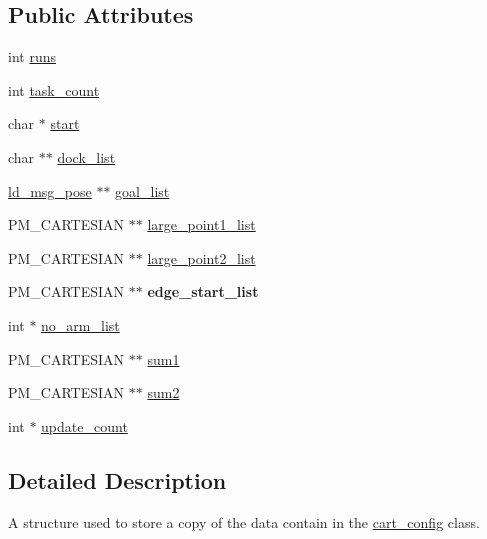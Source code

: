 \subsection*{Public Attributes}
\begin{DoxyCompactItemize}
\item 
int \mbox{\hyperlink{structconfig__data_adc9d0db49d5276dd09e63901adf2d3df}{runs}}
\item 
int \mbox{\hyperlink{structconfig__data_a59732367f47b44028e541b861b07e319}{task\+\_\+count}}
\item 
char $\ast$ \mbox{\hyperlink{structconfig__data_a9553e6685a392714b4d08b4081145565}{start}}
\item 
char $\ast$$\ast$ \mbox{\hyperlink{structconfig__data_a07fc464b6e930d7ff7f843cd4f4fe2dd}{dock\+\_\+list}}
\item 
\mbox{\hyperlink{structld__msg__pose}{ld\+\_\+msg\+\_\+pose}} $\ast$$\ast$ \mbox{\hyperlink{structconfig__data_ad5378ccb37d95d996823422eee9dc9fc}{goal\+\_\+list}}
\item 
P\+M\+\_\+\+C\+A\+R\+T\+E\+S\+I\+AN $\ast$$\ast$ \mbox{\hyperlink{structconfig__data_a7b2d512bbdc163be02d2ca8978180c34}{large\+\_\+point1\+\_\+list}}
\item 
P\+M\+\_\+\+C\+A\+R\+T\+E\+S\+I\+AN $\ast$$\ast$ \mbox{\hyperlink{structconfig__data_ae7e80641b121bea61d098ee3567052f9}{large\+\_\+point2\+\_\+list}}
\item 
\mbox{\label{structconfig__data_a2e43bd4fff00503e709d02febf52a54e}} 
P\+M\+\_\+\+C\+A\+R\+T\+E\+S\+I\+AN $\ast$$\ast$ {\bfseries edge\+\_\+start\+\_\+list}
\item 
int $\ast$ \mbox{\hyperlink{structconfig__data_a05d5897890c90a80bfcc574a2691a367}{no\+\_\+arm\+\_\+list}}
\item 
P\+M\+\_\+\+C\+A\+R\+T\+E\+S\+I\+AN $\ast$$\ast$ \mbox{\hyperlink{structconfig__data_a16e482f7e73e9fe797fbf4b380894aac}{sum1}}
\item 
P\+M\+\_\+\+C\+A\+R\+T\+E\+S\+I\+AN $\ast$$\ast$ \mbox{\hyperlink{structconfig__data_a7b4b5f88455123fafa44f8d48b2ebf3d}{sum2}}
\item 
int $\ast$ \mbox{\hyperlink{structconfig__data_a6ace513dc3e25bf68ceb558cb0c47396}{update\+\_\+count}}
\end{DoxyCompactItemize}


\subsection{Detailed Description}
A structure used to store a copy of the data contain in the \mbox{\hyperlink{classcart__config}{cart\+\_\+config}} class. 

